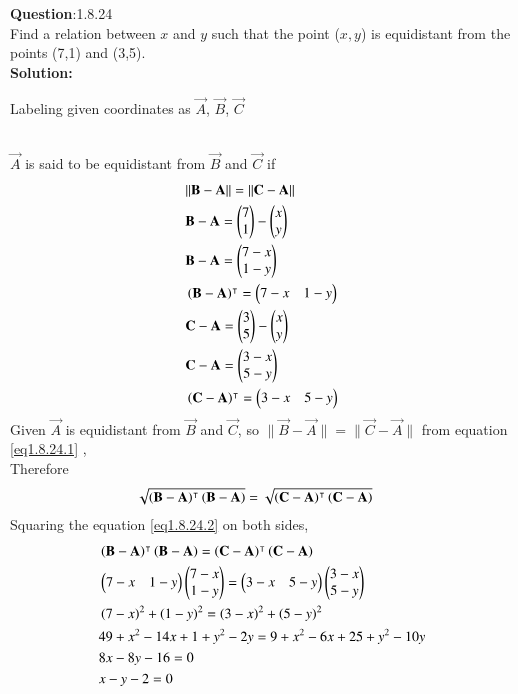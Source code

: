 \documentclass[journal]{IEEEtran}
\begin{document}
\textbf{Question}:1.8.24\\
Find a relation between $x$ and $y$ such that the point ($x,y$) is equidistant from the points (7,1) and (3,5).
\\
\textbf{Solution:}
\renewcommand{\tablename}{Table 1.8.24.1}
\begin{table}[h!]
  \centering
  
  \caption{Labeling given coordinates as $\vec{A}$, $\vec{B}$, $\vec{C}$}
\end{table}
\\
$\vec{A}$ is said to be equidistant from $\vec{B}$ and $\vec{C}$ if 
 \begin{align}
    & \lVert \mathbf{B} - \mathbf{A} \rVert = \lVert \mathbf{C} - \mathbf{A} \rVert \label{eq1.8.24.1} \\ &
     \mathbf{B} - \mathbf{A} = \begin{pmatrix}7 \\ 1\end{pmatrix} - \begin{pmatrix}x \\ y\end{pmatrix} \\ &
     \mathbf{B} - \mathbf{A} = \begin{pmatrix}7 - x \\ 1 - y\end{pmatrix} \\ &
     \left(\mathbf{B} - \mathbf{A}\right)^\intercal = \begin{pmatrix}7 - x & 1 - y\end{pmatrix} \\ &
     \mathbf{C} - \mathbf{A} = \begin{pmatrix}3 \\ 5\end{pmatrix} - \begin{pmatrix}x \\ y\end{pmatrix} \\ &
     \mathbf{C} - \mathbf{A} = \begin{pmatrix}3 - x \\ 5 - y\end{pmatrix} \\ &
     \left(\mathbf{C} - \mathbf{A}\right)^\intercal = \begin{pmatrix}3 - x & 5 - y\end{pmatrix}
 \end{align}
Given $\vec{A}$ is equidistant from $\vec{B}$ and $\vec{C}$, so $\lVert \vec{B} - \vec{A} \rVert = \lVert \vec{C} - \vec{A} \rVert$ from equation \ref{eq1.8.24.1} , \\
Therefore
\begin{align}
   & \sqrt{\left(\mathbf{B} - \mathbf{A}\right)^\intercal\left(\mathbf{B} - \mathbf{A}\right)} = \sqrt{\left(\mathbf{C} - \mathbf{A}\right)^\intercal\left(\mathbf{C} - \mathbf{A}\right)} \label{eq1.8.24.2} &
\end{align}
Squaring the equation \ref{eq1.8.24.2} on both sides,
\begin{align}
   & \left(\mathbf{B} - \mathbf{A}\right)^\intercal\left(\mathbf{B} - \mathbf{A}\right) = \left(\mathbf{C} - \mathbf{A}\right)^\intercal\left(\mathbf{C} - \mathbf{A}\right) \\ &
    \begin{pmatrix}7 - x & 1 - y\end{pmatrix}\begin{pmatrix}7 - x \\ 1 - y\end{pmatrix} = \begin{pmatrix}3 - x & 5 - y\end{pmatrix}\begin{pmatrix}3 - x \\ 5 - y\end{pmatrix} \\ &
    \left(7 - x\right)^2 + \left(1 - y\right)^2 = \left(3 - x\right)^2 + \left(5 - y\right)^2 \\ &
    49 + x^2 - 14x + 1 + y^2 - 2y = 9 + x^2 -6x + 25 + y^2 -10y \\ &
    8x - 8y - 16 = 0 \\ &
    x - y - 2 = 0
\end{align}
\end{document}
